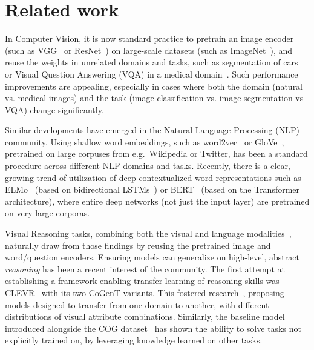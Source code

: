 \section{Related work}
\label{sec:related_work}

In Computer Vision, it is now standard practice to pretrain an image encoder (such as VGG~\cite{simonyan2014very} or ResNet~\cite{he2016deep}) on large-scale datasets (such as ImageNet~\cite{deng2009imagenet}), and reuse the weights in unrelated domains and tasks, such as segmentation of cars~\cite{iglovikov2018ternausnet} or Visual Question Answering (VQA) in a medical domain~\cite{kornuta2019leveraging}.
Such performance improvements are appealing, especially in cases where both the domain (natural vs. medical images) and the task (image classification vs. image segmentation vs VQA) change significantly.

Similar developments have emerged in the Natural Language Processing (NLP) community.
Using shallow word embeddings, such as word2vec~\cite{mikolov2013distributed} or GloVe~\cite{pennington2014glove}, pretrained on large corpuses from e.g.\ Wikipedia or Twitter, has been a standard procedure across different NLP domains and tasks.
Recently, there is a clear, growing trend of utilization of deep contextualized word representations such as ELMo~\cite{peters2018deep} (based on bidirectional LSTMs~\cite{hochreiter1997long}) or BERT~\cite{devlin2018bert} (based on the Transformer~\cite{vaswani2017attention} architecture), where entire deep networks (not just the input layer) are pretrained on very large corporas.

Visual Reasoning tasks, combining both the visual and language modalities~\cite{mogadala2019trends}, naturally draw from those findings by reusing the pretrained image and word/question encoders.
Ensuring models can generalize on high-level, abstract \emph{reasoning} has been a recent interest of the community.
The first attempt at establishing a framework enabling transfer learning of reasoning skills was CLEVR~\cite{johnson2017clevr} with its two CoGenT variants.
This fostered research~\cite{mascharka2018transparency,perez2018film,johnson2017inferring,marois2018transfer}, proposing models designed to transfer from one domain to another, with different distributions of visual attribute combinations.
Similarly, the baseline model introduced alongside the COG dataset~\cite{yang2018dataset} has shown the ability to solve tasks not explicitly trained on, by leveraging knowledge learned on other tasks.


